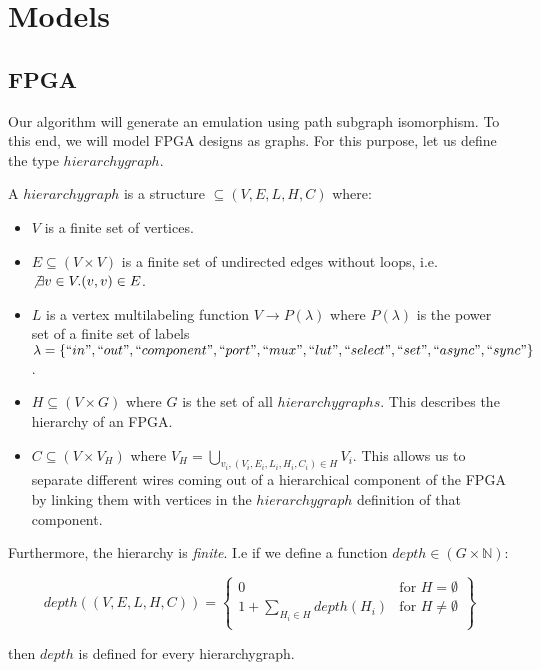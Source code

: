 \section{Models}
\subsection{FPGA}
Our algorithm will generate an emulation using path subgraph isomorphism. To this end, we will model FPGA designs as graphs. For this purpose, let us define the type $hierarchygraph$.


\begin{defn}
A $hierarchygraph$ is a structure $\subseteq (V, E, L, H, C)$ where:

\begin{itemize}
\item $V$ is a finite set of vertices.
\item $E\subseteq (V \times V)$ is a finite set of undirected edges without loops, i.e. $\not \exists v \in V . (v, v) \in E$.
\item $L$ is a vertex multilabeling function $V \to P(\lambda)$ where $P(\lambda)$ is the power set of a finite set of labels $\lambda=\{``in", ``out", ``component", ``port", ``mux", ``lut", ``select", ``set", ``async", ``sync"\}$.
\item $H \subseteq(V \times G)$ where $G$ is the set of all $hierarchygraphs$. This describes the hierarchy of an FPGA.
\item $C \subseteq (V \times V_H)$ where $V_H=\bigcup_{v_i, (V_i, E_i, L_i, H_i, C_i) \in H} V_i$. This allows us to separate different wires coming out of a hierarchical component of the FPGA by linking them with vertices in the $hierarchygraph$ definition of that component.
\end{itemize}

Furthermore, the hierarchy is \textit{finite}. I.e if we define a function $depth \in (G \times \mathbb{N})$:

\[
    depth((V, E, L, H, C)) = \left\{\begin{array}{lr}
        0   & \text{for } H=\emptyset\\
        1 + \sum\limits_{H_i \in H}depth(H_i)	 & \text{for } H\neq \emptyset\\
\end{array}\right\}
  \]
  
then $depth$ is defined for every hierarchygraph.
\end{defn}


